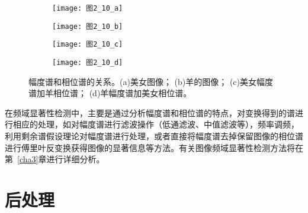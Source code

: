 \begin{figure}[b]
  \centering%
  \begin{subfigure}{0.3\textwidth}
    \texttt{[image: 图2\_10\_a]}
    \caption{}
    \label{图2_10_a}
  \end{subfigure}
  \hspace{4em}%
  \begin{subfigure}{0.3\textwidth}
    \texttt{[image: 图2\_10\_b]}
    \caption{}
    \label{图2_10_b}
  \end{subfigure}
  \hspace{4em}%
  \begin{subfigure}{0.3\textwidth}
    \texttt{[image: 图2\_10\_c]}
    \caption{}
    \label{图2_10_c}
  \end{subfigure}
  \hspace{4em}%
  \begin{subfigure}{0.3\textwidth}
    \texttt{[image: 图2\_10\_d]}
    \caption{}
    \label{图2_10_d}
  \end{subfigure}
  \caption{幅度谱和相位谱的关系。(a)美女图像； (b)羊的图像； (c)美女幅度谱加羊相位谱； (d)羊幅度谱加美女相位谱。}
  \label{图2_10}
\end{figure}

在频域显著性检测中，主要是通过分析幅度谱和相位谱的特点，对变换得到的谱进行相应的处理，如对幅度谱进行滤波操作（低通滤波、中值滤波等），频率调频，利用剩余谱假设理论对幅度谱进行处理，或者直接将幅度谱去掉保留图像的相位谱进行傅里叶反变换获得图像的显著信息等方法。有关图像频域显著性检测方法将在第~\ref{cha3}章进行详细分析。

\section{后处理}
\label{2_4}

